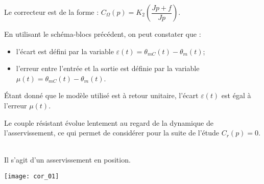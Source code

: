 \begin{multicols}{2}
Le correcteur est de la forme : $C_{\Omega}(p)=K_2 \left( \dfrac{Jp +f}{Jp}\right)$. 

En utilisant le schéma-blocs précédent, on peut constater que : 
\begin{itemize}
\item l'écart est défini par la variable $\varepsilon(t) = \theta_{mC}(t)-\theta_m(t)$;
\item l'erreur entre l’entrée et la sortie est définie par la variable $\mu(t)= \theta_{mC}(t)-\theta_m(t)$.
\end{itemize}

Étant donné que le modèle utilisé est à retour unitaire, l’écart $\varepsilon(t)$ est égal à l’erreur $\mu(t)$. 

\begin{hypo}
Le couple résistant évolue lentement au regard de la dynamique de l’asservissement, ce qui permet de considérer
pour la suite de l’étude $C_r(p)=0$.
\end{hypo}

\fi

\ifprof
\begin{corrige}~\\
Il s'agit d'un asservissement en position. 

\begin{center}
\texttt{[image: cor\_01]}
\end{center}
\end{corrige}


\end{multicols}

